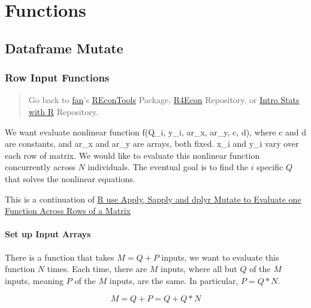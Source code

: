\documentclass[
]{book}
\begin{document}
\hypertarget{functions}{%
\chapter{Functions}\label{functions}}

\hypertarget{dataframe-mutate}{%
\section{Dataframe Mutate}\label{dataframe-mutate}}

\hypertarget{row-input-functions}{%
\subsection{Row Input Functions}\label{row-input-functions}}

\begin{quote}
Go back to \href{http://fanwangecon.github.io/CodeDynaAsset/}{fan}'s \href{https://fanwangecon.github.io/REconTools/}{REconTools} Package, \href{https://fanwangecon.github.io/R4Econ/}{R4Econ} Repository, or \href{https://fanwangecon.github.io/Stat4Econ/}{Intro Stats with R} Repository.
\end{quote}

We want evaluate nonlinear function f(Q\_i, y\_i, ar\_x, ar\_y, c, d), where c and d are constants, and ar\_x and ar\_y are arrays, both fixed. x\_i and y\_i vary over each row of matrix. We would like to evaluate this nonlinear function concurrently across \(N\) individuals. The eventual goal is to find the \(i\) specific \(Q\) that solves the nonlinear equations.

This is a continuation of \href{https://fanwangecon.github.io/R4Econ/function/noloop/fs_applysapplymutate.html}{R use Apply, Sapply and dplyr Mutate to Evaluate one Function Across Rows of a Matrix}

\hypertarget{set-up-input-arrays}{%
\subsubsection{Set up Input Arrays}\label{set-up-input-arrays}}

There is a function that takes \(M=Q+P\) inputs, we want to evaluate this function \(N\) times. Each time, there are \(M\) inputs, where all but \(Q\) of the \(M\) inputs, meaning \(P\) of the \(M\) inputs, are the same. In particular, \(P=Q*N\).

\[M = Q+P = Q + Q*N\]
\end{document}

